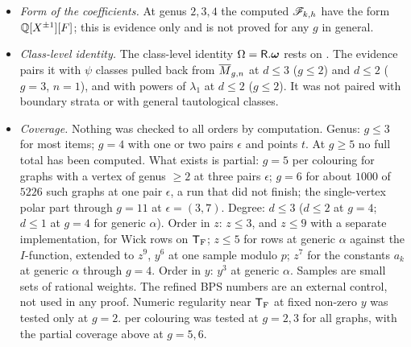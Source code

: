 \begin{itemize}
\item \emph{Form of the coefficients.} At genus $2,3,4$ the computed $\mathscr{F}_{k,h}$ have the form $\mathbb{Q}[X^{\pm1}][F]$; this is evidence only and is not proved for any $g$ in general.
\item \emph{Class-level identity.} The class-level identity $\Omega=\mathsf{R}.\boldsymbol{\omega}$ rests on \cite[Theorem~(2)]{Tel12}. The evidence pairs it with $\psi$ classes pulled back from $\overline{M}_{g,n}$ at $d\leq 3$ ($g\leq 2$) and $d\leq 2$ ($g=3$, $n=1$), and with powers of $\lambda_1$ at $d\leq 2$ ($g\leq 2$). It was not paired with boundary strata or with general tautological classes.
\item \emph{Coverage.} Nothing was checked to all orders by computation. Genus: $g\leq 3$ for most items; $g=4$ with one or two pairs $\epsilon$ and points $t$. At $g\geq 5$ no full total has been computed. What exists is partial: $g=5$ per colouring for graphs with a vertex of genus $\geq 2$ at three pairs $\epsilon$; $g=6$ for about $1000$ of $5226$ such graphs at one pair $\epsilon$, a run that did not finish; the single-vertex polar part through $g=11$ at $\epsilon=(3,7)$. Degree: $d\leq 3$ ($d\leq 2$ at $g=4$; $d\leq 1$ at $g=4$ for generic $\alpha$). Order in $z$: $z\leq 3$, and $z\leq 9$ with a separate implementation, for Wick rows on $\mathsf{T}_{\mathrm{F}}$; $z\leq 5$ for rows at generic $\alpha$ against the $I$-function, extended to $z^9$, $y^6$ at one sample modulo $p$; $z^7$ for the constants $a_k$ at generic $\alpha$ through $g=4$. Order in $y$: $y^3$ at generic $\alpha$. Samples are small sets of rational weights. The refined BPS numbers are an external control, not used in any proof. Numeric regularity near $\mathsf{T}_{\mathrm{F}}$ at fixed non-zero $y$ was tested only at $g=2$.  per colouring was tested at $g=2,3$ for all graphs, with the partial coverage above at $g=5,6$.
\end{itemize}
\endgroup
